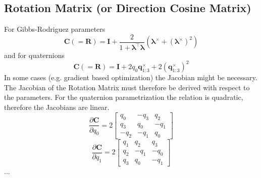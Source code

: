 \subsection{Rotation Matrix (or Direction Cosine Matrix)}
For Gibbs-Rodriguez parameters
\begin{equation}
\mathbf{C} (= \mathbf{R}) = \mathbf{I} + \frac{2}{1+\boldsymbol{\lambda}^\top \boldsymbol{\lambda}}
\left(\boldsymbol{\lambda}^\times + \left(\boldsymbol{\lambda}^\times\right)^2\right)
\end{equation}
and for quaternions
\begin{equation}
\mathbf{C} (= \mathbf{R}) = \mathbf{I} + 2 q_0 \mathbf{q}_{1:3}^\times + 2 \left(\mathbf{q}_{1:3}^\times\right)^2
\end{equation}
In some cases (e.g. gradient based optimization) the Jacobian might be necessary. The Jacobian of the Rotation Matrix must therefore be derived with respect to the parameters. For the quaternion parametrization the relation is quadratic, therefore the Jacobians are linear.
\begin{equation}
\frac{\partial \mathbf{C}}{\partial q_0} = 2 \left[ 
\begin{array}{ccc}
 q_0 & -q_3 &  q_2 \\
 q_3 &  q_0 & -q_1 \\
-q_2 & -q_1 &  q_0
\end{array} \right]
\end{equation}
\begin{equation}
\frac{\partial \mathbf{C}}{\partial q_1} = 2 \left[ 
\begin{array}{ccc}
q_1 & q_2 &   q_3 \\
q_2 & -q_1 & -q_0 \\
q_3 & q_0 &  -q_1
\end{array} \right]
\end{equation}
...

